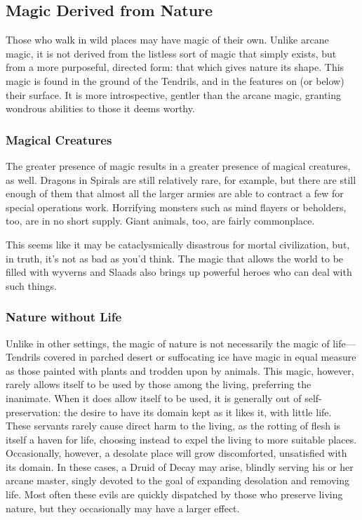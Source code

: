 \begin{multicols}{2}
\subsection{Magic Derived from Nature}
Those who walk in wild places may have magic of their own.
Unlike arcane magic, it is not derived from the listless sort of magic that simply exists, but from a more purposeful, directed form: that which gives nature its shape.
This magic is found in the ground of the Tendrils, and in the features on (or below) their surface.
It is more introspective, gentler than the arcane magic, granting wondrous abilities to those it deems worthy. 

\subsubsection{Magical Creatures}
The greater presence of magic results in a greater presence of magical creatures, as well.
Dragons in Spirals are still relatively rare, for example, but there are still enough of them that almost all the larger armies are able to contract a few for special operations work.
Horrifying monsters such as mind flayers or beholders, too, are in no short supply.
Giant animals, too, are fairly commonplace.

This seems like it may be cataclysmically disastrous for mortal civilization, but, in truth, it's not as bad as you'd think.
The magic that allows the world to be filled with wyverns and Slaads also brings up powerful heroes who can deal with such things.

\subsubsection{Nature without Life}
Unlike in other settings, the magic of nature is not necessarily the magic of life---Tendrils covered in parched desert or suffocating ice have magic in equal measure as those painted with plants and trodden upon by animals.
This magic, however, rarely allows itself to be used by those among the living, preferring the inanimate.
When it does allow itself to be used, it is generally out of self-preservation: the desire to have its domain kept as it likes it, with little life.
These servants rarely cause direct harm to the living, as the rotting of flesh is itself a haven for life, choosing instead to expel the living to more suitable places.
\label{druidofdecay}
Occasionally, however, a desolate place will grow discomforted, unsatisfied with its domain.
In these cases, a Druid of Decay may arise, blindly serving his or her arcane master, singly devoted to the goal of expanding desolation and removing life.
Most often these evils are quickly dispatched by those who preserve living nature, but they occasionally may have a larger effect.


\end{multicols}

